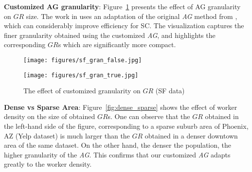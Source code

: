 \documentclass{USC-Thesis}
\numberwithin{equation}{chapter}
\begin{document}
\textbf{Customized AG granularity}: Figure~\ref{fig:customized_gran} presents the effect of AG granularity on $\mathit{GR}$ size. The work in \cite{to2014framework} uses an adaptation of the original {\em AG} method from \cite{qardaji2012differentially}, which can considerably improve efficiency for SC. The visualization captures the finer granularity obtained using the customized {\em AG}, and highlights the corresponding $\mathit{GR}$s which are significantly more compact.

\begin{figure}[!ht]
	\centering
	\begin{minipage}[b]{0.35\linewidth}
		\texttt{[image: figures/sf\_gran\_false.jpg]}
		\label{fig:original_AG}
	\end{minipage}
	\hspace{1cm}
	\centering
	\begin{minipage}[b]{0.35\linewidth}
		\texttt{[image: figures/sf\_gran\_true.jpg]}
		\label{fig:modified_AG}
	\end{minipage}
	\caption{The effect of customized granularity on $\mathit{GR}$ (SF data)}
\label{fig:customized_gran}
\end{figure}

   
   
%   
   
   
   
\textbf{Dense vs Sparse Area}: Figure~\ref{fig:dense_sparse} shows the effect of worker density on the size of obtained $\mathit{GR}$s. One can observe that the $\mathit{GR}$ obtained in the left-hand side of the figure, corresponding to a sparse suburb area of Phoenix, AZ (Yelp dataset) is much larger than the $\mathit{GR}$ obtained in a denser downtown area of the same dataset. On the other hand, the denser the population, the higher granularity of the {\em AG}. This confirms that our customized {\em AG} \cite{to2014framework} adapts greatly to the worker density.
\end{document}
